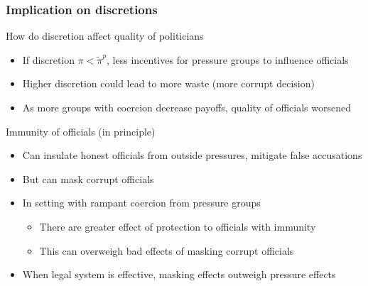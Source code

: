 \documentclass[aspectratio=169]{beamer}
\begin{document}
\begin{frame}
\frametitle{Implication on discretions}
How do discretion affect quality of politicians 
\begin{itemize}\setlength\itemsep{3pt}
\item If discretion $\pi<\tilde{\pi}^p$, less incentives for pressure groups to influence officials
\item Higher discretion could lead to more waste (more corrupt decision)
\item As more groups with coercion decrease payoffs, quality of officials worsened
\end{itemize}\medskip
Immunity of officials (in principle)
\begin{itemize}\setlength\itemsep{3pt}
\item Can insulate honest officials from outside pressures, mitigate false accusations
\item But can mask corrupt officials
\item In setting with rampant coercion from pressure groups
\begin{itemize}\setlength\itemsep{3pt}
\item There are greater effect of protection to officials with immunity
\item This can overweigh bad effects of masking corrupt officials
\end{itemize}
\item When legal system is effective, masking effects outweigh pressure effects
\end{itemize}
\end{frame}
\end{document}
